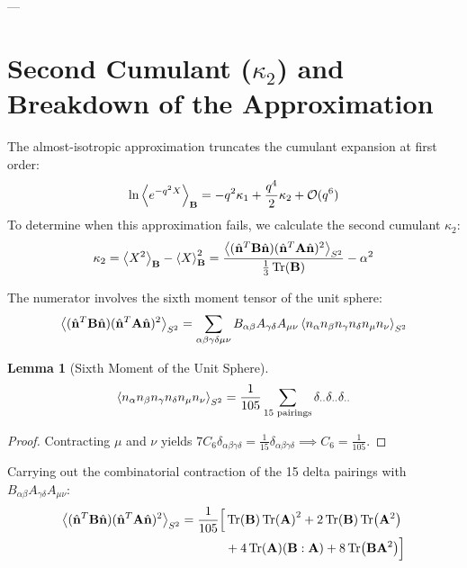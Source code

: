 \documentclass[11pt,a4paper]{article}
\theoremstyle{definition}
\newtheorem{lemma}{Lemma}
\begin{document}
---

\section{Second Cumulant \texorpdfstring{($\kappa_2$)}{(kappa2)} and Breakdown of the Approximation}
\label{sec:cumulant2_breakdown}

The almost-isotropic approximation truncates the cumulant expansion at first order:
\begin{equation}
\ln \ev{e^{-q^2 X}}_{\mathbf{B}} = -q^2 \kappa_1 + \frac{q^4}{2} \kappa_2 + \mathcal{O}(q^6)
\end{equation}
To determine when this approximation fails, we calculate the second cumulant $\kappa_2$:
\begin{equation}
\kappa_2 = \ev{X^2}_{\mathbf{B}} - \ev{X}_{\mathbf{B}}^2 = \frac{\ev{(\hat{\mathbf{n}}^T \mathbf{B} \hat{\mathbf{n}})(\hat{\mathbf{n}}^T \mathbf{A} \hat{\mathbf{n}})^2}_{S^2}}{\frac{1}{3}\Tr(\mathbf{B})} - \alpha^2
\label{eq:kappa2_def}
\end{equation}

The numerator involves the sixth moment tensor of the unit sphere:
\begin{equation}
\ev{(\hat{\mathbf{n}}^T \mathbf{B} \hat{\mathbf{n}})(\hat{\mathbf{n}}^T \mathbf{A} \hat{\mathbf{n}})^2}_{S^2} = \sum_{\alpha\beta\gamma\delta\mu\nu} B_{\alpha\beta} A_{\gamma\delta} A_{\mu\nu} \ev{n_\alpha n_\beta n_\gamma n_\delta n_\mu n_\nu}_{S^2}
\end{equation}

\begin{lemma}[Sixth Moment of the Unit Sphere]
\begin{equation}
\ev{n_\alpha n_\beta n_\gamma n_\delta n_\mu n_\nu}_{S^2} = \frac{1}{105} \sum_{15 \text{ pairings}} \delta_{\cdot\cdot}\delta_{\cdot\cdot}\delta_{\cdot\cdot}
\end{equation}
\end{lemma}
\begin{proof}
Contracting $\mu$ and $\nu$ yields $7 C_6 \delta_{\alpha\beta\gamma\delta} = \frac{1}{15}\delta_{\alpha\beta\gamma\delta} \implies C_6 = \frac{1}{105}$.
\end{proof}

Carrying out the combinatorial contraction of the 15 delta pairings with $B_{\alpha\beta} A_{\gamma\delta} A_{\mu\nu}$:
\begin{align}
\ev{(\hat{\mathbf{n}}^T \mathbf{B} \hat{\mathbf{n}})(\hat{\mathbf{n}}^T \mathbf{A} \hat{\mathbf{n}})^2}_{S^2} = \frac{1}{105} \Big[ & \Tr(\mathbf{B}) \Tr(\mathbf{A})^2 + 2 \Tr(\mathbf{B}) \Tr(\mathbf{A}^2) \nonumber \\
& + 4 \Tr(\mathbf{A}) (\mathbf{B}:\mathbf{A}) + 8 \Tr(\mathbf{B}\mathbf{A}^2) \Big]
\end{align}
\end{document}
